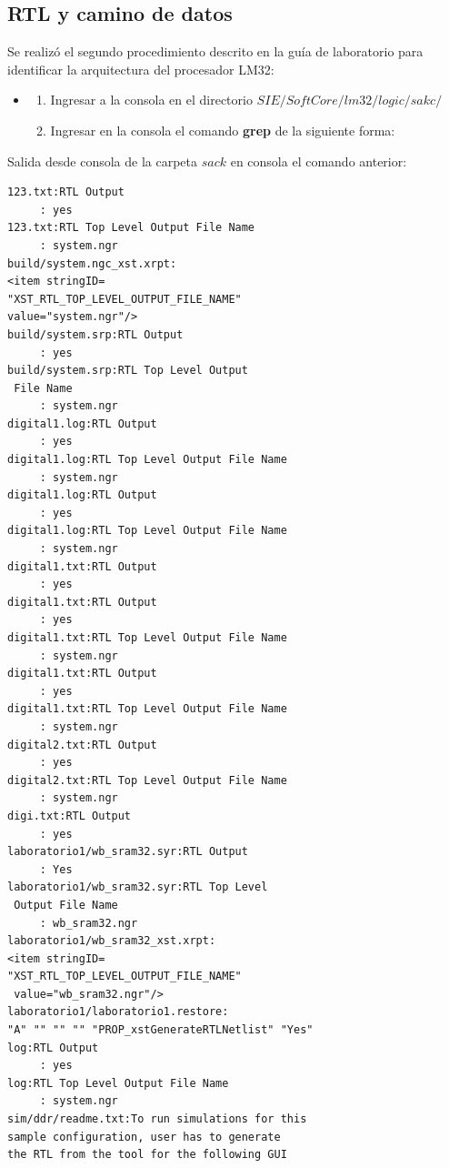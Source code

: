 \documentclass[twocolumn]{IEEEtran}
\begin{document}
\subsection{RTL y camino de datos}
\noindent
Se realizó el segundo procedimiento descrito en la guía de laboratorio para identificar la arquitectura del procesador LM32:
\begin{itemize}
 \item 
    \begin{enumerate}
     \item Ingresar a la consola en el directorio $SIE/SoftCore/lm32/logic/sakc/$
     \item Ingresar en la consola el comando \textbf{grep} de la siguiente forma:
    \end{enumerate}
\end{itemize}
\noindent
Salida desde consola de la carpeta $sack$ en consola el comando anterior:
\begin{verbatim}
123.txt:RTL Output                    
     : yes
123.txt:RTL Top Level Output File Name
     : system.ngr
build/system.ngc_xst.xrpt:        
<item stringID=
"XST_RTL_TOP_LEVEL_OUTPUT_FILE_NAME" 
value="system.ngr"/>
build/system.srp:RTL Output                     
     : yes
build/system.srp:RTL Top Level Output
 File Name
     : system.ngr
digital1.log:RTL Output                     
     : yes
digital1.log:RTL Top Level Output File Name
     : system.ngr
digital1.log:RTL Output                    
     : yes
digital1.log:RTL Top Level Output File Name
     : system.ngr
digital1.txt:RTL Output                     
     : yes
digital1.txt:RTL Output                  
     : yes
digital1.txt:RTL Top Level Output File Name
     : system.ngr
digital1.txt:RTL Output                    
     : yes
digital1.txt:RTL Top Level Output File Name
     : system.ngr
digital2.txt:RTL Output                    
     : yes
digital2.txt:RTL Top Level Output File Name
     : system.ngr
digi.txt:RTL Output                   
     : yes
laboratorio1/wb_sram32.syr:RTL Output      
     : Yes
laboratorio1/wb_sram32.syr:RTL Top Level
 Output File Name
     : wb_sram32.ngr
laboratorio1/wb_sram32_xst.xrpt:
<item stringID=
"XST_RTL_TOP_LEVEL_OUTPUT_FILE_NAME"
 value="wb_sram32.ngr"/>
laboratorio1/laboratorio1.restore:
"A" "" "" "" "PROP_xstGenerateRTLNetlist" "Yes" 
log:RTL Output                    
     : yes
log:RTL Top Level Output File Name
     : system.ngr
sim/ddr/readme.txt:To run simulations for this
sample configuration, user has to generate 
the RTL from the tool for the following GUI
\end{verbatim}
\end{document}
